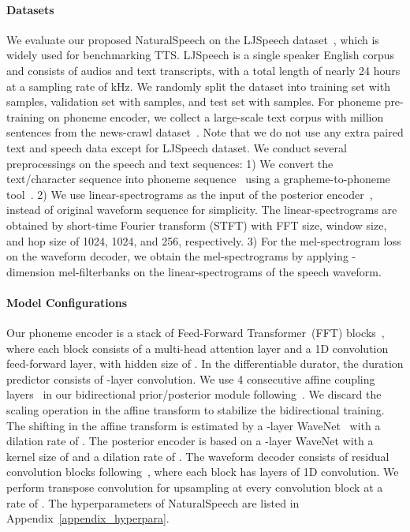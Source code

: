 \documentclass{article}
\theoremstyle{definition}
\def\myname{NaturalSpeech}
\begin{document}
\paragraph{Datasets}
We evaluate our proposed \myname{} on the LJSpeech dataset~\citep{ljspeech17}, which is widely used for benchmarking TTS. LJSpeech is a single speaker English corpus and consists of  audios and text transcripts, with a total length of nearly 24 hours at a sampling rate of kHz. We randomly split the dataset into training set with  samples, validation set with  samples, and test set with  samples. For phoneme pre-training on phoneme encoder, we collect a large-scale text corpus with  million sentences from the news-crawl dataset~\citep{newscrawl22}. Note that we do not use any extra paired text and speech data except for LJSpeech dataset. We conduct several preprocessings on the speech and text sequences: 1) We convert the text/character sequence into phoneme sequence~\cite{sun2019token} using a grapheme-to-phoneme tool~\citep{Bernard2021}. 2) We use linear-spectrograms as the input of the posterior encoder~\citep{kim2021conditional}, instead of original waveform sequence for simplicity. The linear-spectrograms are obtained by short-time Fourier transform (STFT) with FFT size, window size, and hop size of 1024, 1024, and 256, respectively. 3) For the mel-spectrogram loss on the waveform decoder, we obtain the mel-spectrograms by applying -dimension mel-filterbanks on the linear-spectrograms of the speech waveform. 

\paragraph{Model Configurations} 
Our phoneme encoder is a stack of  Feed-Forward Transformer~(FFT) blocks~\cite{ren2019fastspeech}, where each block consists of a multi-head attention layer and a 1D convolution feed-forward layer, with hidden size of . In the differentiable durator, the duration predictor consists of -layer convolution. We use 4 consecutive affine coupling layers~\cite{dinh2016density} in our bidirectional prior/posterior module following~\citep{kim2021conditional}. We discard the scaling operation in the affine transform to stabilize the bidirectional training. The shifting in the affine transform is estimated by a -layer WaveNet~\cite{oord2016wavenet} with a dilation rate of . The posterior encoder is based on a -layer WaveNet with a kernel size of  and a dilation rate of . The waveform decoder consists of  residual convolution blocks following~\citep{kong2020hifi}, where each block has  layers of 1D convolution. We perform transpose convolution for upsampling at every convolution block at a rate of . The hyperparameters of \myname{} are listed in Appendix~\ref{appendix_hyperpara}.
\end{document}
